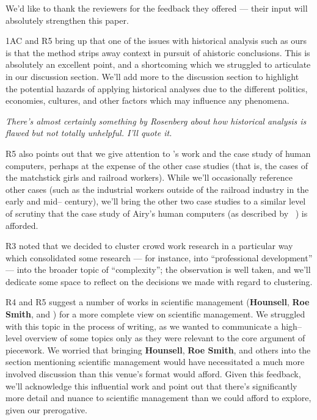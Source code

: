 \documentclass[11pt]{article}
\begin{document}
We'd like to thank the reviewers for the feedback they offered
--- their input will absolutely strengthen this paper.

1AC and R5 bring up that one of the issues with historical analysis such as ours
is that the method strips away context in pursuit of ahistoric conclusions.
This is absolutely an excellent point, and
a shortcoming which we struggled to articulate in our discussion section.
We'll add more to the discussion section to highlight the potential hazards
of applying historical analyses due to the different
politics, economies, cultures, and other factors which
may influence any phenomena.

\textit{There's almost certainly something by Rosenberg about how
        historical analysis is flawed but not totally unhelpful.
        I'll quote it.}

R5 also points out that we give attention to \citeauthor{grier2013computers}'s work and
the case study of human computers,
perhaps at the expense of the other case studies
(that is, the cases of the matchstick girls and railroad workers).
While we'll occasionally reference other cases
(such as the industrial workers outside of
the railroad industry in the early and mid-- century),
we'll bring the other two case studies to
a similar level of scrutiny that the case study of Airy's human computers
(as described by \citeauthor{grier2013computers}~\cite{grier2013computers}) is afforded.

R3 noted that we decided to cluster crowd work research in a particular way
which consolidated some research
--- for instance, into ``professional development'' --- into
the broader topic of ``complexity'';
the observation is well taken, and we'll dedicate some space to reflect on
the decisions we made with regard to clustering.

R4 and R5 suggest a number of works in scientific management
(\textbf{Hounsell}, \textbf{Roe Smith}, and \citeauthor{williamson2016}) for a more complete view on scientific management.
We struggled with this topic in the process of writing,
as we wanted to communicate a high--level overview of some topics only as they
were relevant to the core argument of piecework.
We worried that bringing \textbf{Hounsell}, \textbf{Roe Smith}, and others into
the section mentioning scientific management would have necessitated
a much more involved discussion than
this venue's format would afford.
Given this feedback, we'll
acknowledge this influential work and point out that there's
significantly more detail and nuance to scientific management than
we could afford to explore, given our prerogative.






\printbibliography{}
\end{document}
